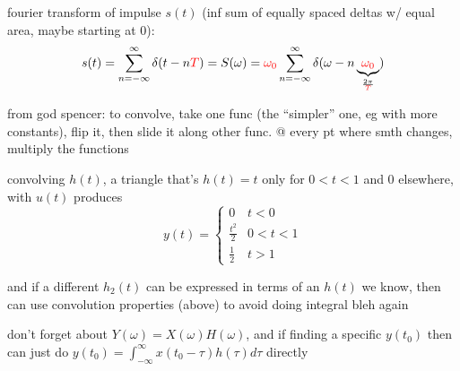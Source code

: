 \documentclass[a5paper, fleqn]{article}
\newcommand{\emf}[1]{\textcolor{red}{#1}}
\newcommand{\wrap}{\hangpara{0.5cm}{1}}
\begin{document}
\wrap fourier transform of impulse $s(t)$ (inf sum of equally spaced deltas w/ equal area, maybe starting at 0):
\[s(t) = \sum_{n = -\infty}^\infty \delta(t - n\emf{T}) = S(\omega) = \emf{\omega_0} \sum_{n = -\infty}^\infty \delta(\omega - n\underbrace{\emf{\omega_0}}_{\frac{2\pi}{\emf{T}}})\]

\wrap from god spencer: to convolve, take one func (the ``simpler'' one, eg with more constants), flip it, then slide it along other func. @ every pt where smth changes, multiply the functions

\wrap convolving $h(t)$, a triangle that's $h(t) = t$ only for $0 < t < 1$ and 0 elsewhere, with $u(t)$ produces
\[y(t) = \begin{cases}
    0             & t < 0     \\
    \frac{t^2}{2} & 0 < t < 1 \\
    \frac{1}{2}   & t > 1
  \end{cases}\]

\wrap and if a different $h_2(t)$ can be expressed in terms of an $h(t)$ we know, then can use convolution properties (above) to avoid doing integral bleh again

\wrap don't forget about $Y(\omega) = X(\omega) H(\omega)$, and if finding a specific $y(t_0)$ then can just do $y(t_0) = \int_{-\infty}^\infty x(t_0 - \tau) h(\tau) d\tau$ directly
\end{document}
